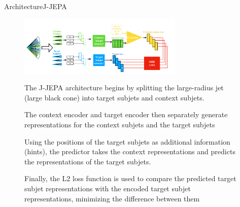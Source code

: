 \documentclass[10pt]{beamer}
\let\olditemize\itemize
\let\endolditemize\enditemize
\renewenvironment{itemize}{
  \olditemize[<+->] %
}{\endolditemize}
\begin{document}
\begin{frame}{Architecture}{J-JEPA}

\begin{figure}
  \includegraphics[width=0.7\textwidth]{jjepa.png}

  \begin{footnotesize}
    \begin{itemize}
      \item The J-JEPA architecture begins by splitting the large-radius jet (large black cone) into
target subjets and context subjets.

\item The context encoder and target encoder then separately generate
representations for the context subjets and the target subjets

\item  Using the positions of the target subjets
 as additional information (hints), the predictor takes the context representations and predicts the
 representations of the target subjets.

\item Finally, the L2 loss function is used to compare the predicted
 target subjet representations with the encoded target subjet representations, minimizing the difference
 between them
\end{itemize}
\end{footnotesize}
\end{figure}

\end{frame}
\end{document}
